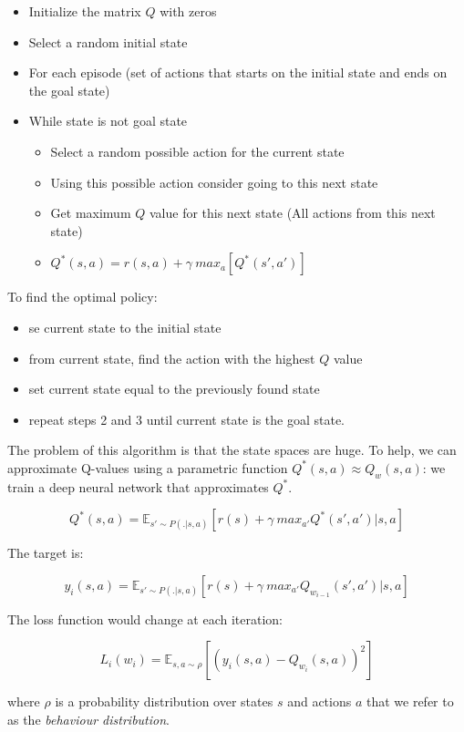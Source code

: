 \documentclass[11pt]{article}
\begin{document}
\begin{itemize}
\tightlist
\item
  Initialize the matrix \(Q\) with zeros
\item
  Select a random initial state
\item
  For each episode (set of actions that starts on the initial state and
  ends on the goal state)
\item
  While state is not goal state

  \begin{itemize}
  \tightlist
  \item
    Select a random possible action for the current state
  \item
    Using this possible action consider going to this next state
  \item
    Get maximum \(Q\) value for this next state (All actions from this
    next state)
  \item
    \(Q^*(s, a)=r(s, a)+\gamma\ max_a[Q^*(s', a')]\)
  \end{itemize}
\end{itemize}

To find the optimal policy:

\begin{itemize}
\tightlist
\item
  se current state to the initial state
\item
  from current state, find the action with the highest \(Q\) value
\item
  set current state equal to the previously found state
\item
  repeat steps 2 and 3 until current state is the goal state.
\end{itemize}

The problem of this algorithm is that the state spaces are huge. To
help, we can approximate Q-values using a parametric function
\(Q^*(s, a)\approx Q_w(s, a)\): we train a deep neural network that
approximates \(Q^*\).

\[Q^*(s,a)=\mathbb{E}_{s'\sim P(.|s, a)}[r(s)+\gamma\ max_{a'}Q^*(s', a')|s, a]\]

The target is:

\[y_i(s, a)=\mathbb{E}_{s'\sim P(.|s, a)}[r(s)+\gamma\ max_{a'}Q_{w_{i-1}}(s', a')|s, a]\]

The loss function would change at each iteration:

\[L_i(w_i)=\mathbb{E}_{s, a\sim \rho}[(y_i(s, a)-Q_{w_i}(s, a))^2]\]

where \(\rho\) is a probability distribution over states \(s\) and
actions \(a\) that we refer to as the \emph{behaviour distribution}.
\end{document}

